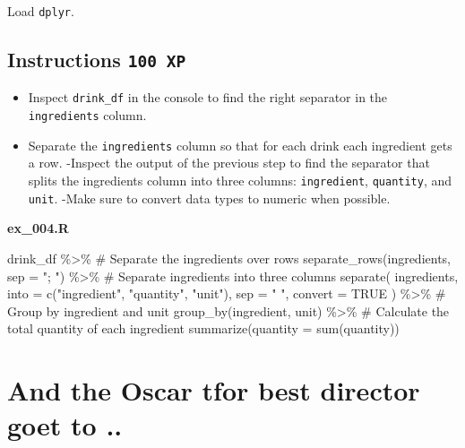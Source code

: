 \documentclass[
  letterpaper,
  DIV=11,
  numbers=noendperiod]{scrreprt}
\newenvironment{Shaded}{\begin{snugshade}}{\end{snugshade}}
\newcommand{\AttributeTok}[1]{\textcolor[rgb]{0.40,0.45,0.13}{#1}}
\newcommand{\CommentTok}[1]{\textcolor[rgb]{0.37,0.37,0.37}{#1}}
\newcommand{\ConstantTok}[1]{\textcolor[rgb]{0.56,0.35,0.01}{#1}}
\newcommand{\FunctionTok}[1]{\textcolor[rgb]{0.28,0.35,0.67}{#1}}
\newcommand{\NormalTok}[1]{\textcolor[rgb]{0.00,0.23,0.31}{#1}}
\newcommand{\SpecialCharTok}[1]{\textcolor[rgb]{0.37,0.37,0.37}{#1}}
\newcommand{\StringTok}[1]{\textcolor[rgb]{0.13,0.47,0.30}{#1}}
\providecommand{\tightlist}{%
  \setlength{\itemsep}{0pt}\setlength{\parskip}{0pt}}\usepackage{longtable,booktabs,array}
\begin{document}
Load \texttt{dplyr}.

\hypertarget{instructions-100-xp-3}{%
\subsection*{\texorpdfstring{Instructions
\texttt{100\ XP}}{Instructions 100 XP}}\label{instructions-100-xp-3}}

\begin{itemize}
\tightlist
\item
  Inspect \texttt{drink\_df} in the console to find the right separator
  in the \texttt{ingredients} column.
\item
  Separate the \texttt{ingredients} column so that for each drink each
  ingredient gets a row. -Inspect the output of the previous step to
  find the separator that splits the ingredients column into three
  columns: \texttt{ingredient}, \texttt{quantity}, and \texttt{unit}.
  -Make sure to convert data types to numeric when possible.
\end{itemize}

\textbf{ex\_004.R}

\begin{Shaded}
\begin{Highlighting}[]
\NormalTok{drink\_df }\SpecialCharTok{\%\textgreater{}\%} 
  \CommentTok{\# Separate the ingredients over rows}
  \FunctionTok{separate\_rows}\NormalTok{(ingredients, }\AttributeTok{sep =} \StringTok{"; "}\NormalTok{) }\SpecialCharTok{\%\textgreater{}\%} 
  \CommentTok{\# Separate ingredients into three columns}
  \FunctionTok{separate}\NormalTok{(}
\NormalTok{    ingredients, }
    \AttributeTok{into =} \FunctionTok{c}\NormalTok{(}\StringTok{"ingredient"}\NormalTok{, }\StringTok{"quantity"}\NormalTok{, }\StringTok{"unit"}\NormalTok{), }
    \AttributeTok{sep =} \StringTok{" "}\NormalTok{, }
    \AttributeTok{convert =} \ConstantTok{TRUE}
\NormalTok{  ) }\SpecialCharTok{\%\textgreater{}\%} 
  \CommentTok{\# Group by ingredient and unit}
  \FunctionTok{group\_by}\NormalTok{(ingredient, unit) }\SpecialCharTok{\%\textgreater{}\%} 
  \CommentTok{\# Calculate the total quantity of each ingredient}
  \FunctionTok{summarize}\NormalTok{(}\AttributeTok{quantity =} \FunctionTok{sum}\NormalTok{(quantity))}
\end{Highlighting}
\end{Shaded}

\hypertarget{and-the-oscar-tfor-best-director-goet-to-..}{%
\section{\texorpdfstring{And the Oscar tfor best director goet to ..
}{And the Oscar tfor best director goet to .. }}\label{and-the-oscar-tfor-best-director-goet-to-..}}
\end{document}
